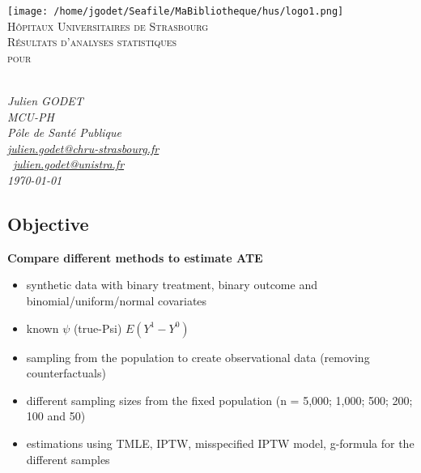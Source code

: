 \documentclass[
]{article}
\author{}
\date{\vspace{-2.5em}}
\providecommand{\tightlist}{%
  \setlength{\itemsep}{0pt}\setlength{\parskip}{0pt}}
\begin{document}
\begin{titlepage}
\begin{center}
\texttt{[image: /home/jgodet/Seafile/MaBibliotheque/hus/logo1.png]}~ \\ [0.5cm]

\textsc{\normalsize H\^opitaux Universitaires de Strasbourg}\\ [2.5cm]

\textsc{\LARGE R\'esultats d'analyses statistiques}\\ [0.5cm]
\textsc{\LARGE pour}\\ [0.5cm]
\textsc{\LARGE  ~}\\ 
\vfill
\vfill
\vfill
\vfill
\vfill
\vfill
\vfill
\vfill
\vfill
\begin{minipage}{0.75\textwidth}
\begin{flushright}

\emph{Julien GODET}\\ 
\emph{MCU-PH}\\ 

\emph{P\^ole de Sant\'e Publique}\\ 
\emph{\href{mailto:julien.godet@chru-strasbourg.fr}{julien.godet@chru-strasbourg.fr}}\\\ 
\emph{\href{mailto:jgodet@unistra.fr}{julien.godet@unistra.fr}} 
~\\ 
\emph{\today}\\ 
\end{flushright}
\end{minipage}
\vfill
\vfill
\end{center}
\end{titlepage}
\newpage
\tableofcontents
\newpage

\hypertarget{objective}{%
\subsection{Objective}\label{objective}}

\textbf{Compare different methods to estimate ATE}

\begin{itemize}
\tightlist
\item
  synthetic data with binary treatment, binary outcome and
  binomial/uniform/normal covariates
\item
  known \(\psi\) (true-Psi) \(E(Y^1 - Y^0)\)
\item
  sampling from the population to create observational data (removing
  counterfactuals)
\item
  different sampling sizes from the fixed population (n = 5,000; 1,000;
  500; 200; 100 and 50)
\item
  estimations using TMLE, IPTW, misspecified IPTW model, g-formula for
  the different samples
\end{itemize}
\end{document}
